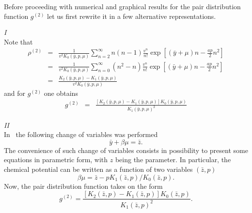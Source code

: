 Before proceeding with numerical and graphical results for the pair distribution function $g^{(2)}$ let us first rewrite it in a few alternative representations.

{\it I}\\
Note that
\begin{eqnarray*}
	\rho^{(2)} & = & \frac{1}{v^2 K_0(\bar{y}, p, \mu)} \sum_{n=2}^{\infty} n(n-1) \frac{v^n}{n!} \exp\left[(\bar{y} + \mu)n - \frac{a p}{2} n^2\right]
	\\
	& = & \frac{1}{v^2 K_0(\bar{y}, p, \mu)} \sum_{n=0}^{\infty} (n^2 - n) \frac{v^n}{n!} \exp\left[(\bar{y} + \mu)n - \frac{a p}{2} n^2\right]
	\\
	& = & \frac{K_2(\bar{y}, p, \mu) - K_1(\bar{y}, p, \mu)}{v^2 K_0(\bar{y}, p, \mu)}
\end{eqnarray*}
and for $g^{(2)}$ one obtains
\begin{eqnarray*}
	g^{(2)} & = & \frac{\left[K_2(\bar{y}, p, \mu) - K_1(\bar{y}, p, \mu)\right] K_0(\bar{y}, p, \mu)}{K_1(\bar{y}, p, \mu)^2}
\end{eqnarray*}

{\it II}\\
In~\cite{MpkDob2022} the following change of variables was performed
\begin{equation*}
	\bar{y} + \beta\mu = \bar{z}.
\end{equation*}
The convenience of such change of variables consists in possibility to present some equations in parametric form, with $z$ being the parameter. In particular, the chemical potential can be written as a function of two variables $(\bar{z}, p)$
\begin{equation*}
	\beta\mu = \bar{z} - p K_1(\bar{z},p)/K_0(\bar{z},p).
\end{equation*}
Now, the pair distribution function takes on the form
\begin{equation}
	g^{(2)} = \frac{\left[K_2(\bar{z}, p) - K_1(\bar{z}, p)\right] K_0(\bar{z}, p)}{K_1(\bar{z}, p)^2}.
\end{equation}


